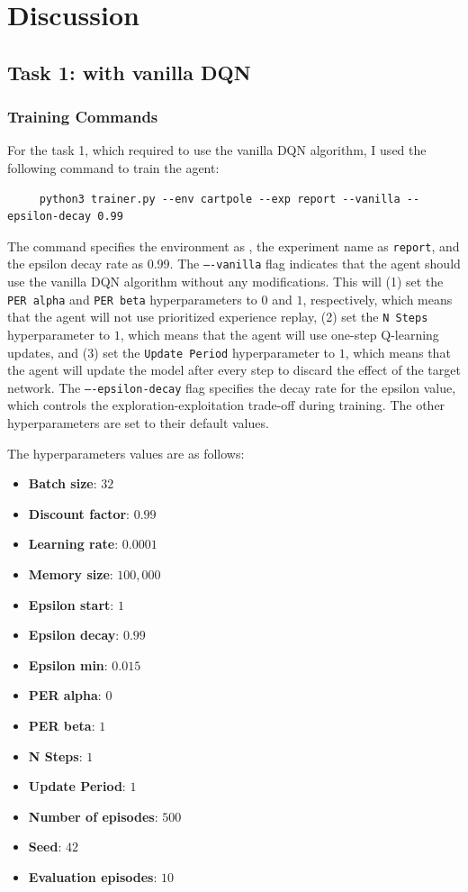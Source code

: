 \section{Discussion}

\subsection{Task 1: \cartpole with vanilla DQN}

\subsubsection{Training Commands}

For the task 1, which required to use the vanilla DQN algorithm, I used the following command to train the agent:

\begin{verbatim}
     python3 trainer.py --env cartpole --exp report --vanilla --epsilon-decay 0.99
\end{verbatim}

The command specifies the environment as \cartpole, the experiment name as \texttt{report}, and the epsilon decay rate as 0.99.
The \texttt{----vanilla} flag indicates that the agent should use the vanilla DQN algorithm without any modifications. This will (1) set the \texttt{PER alpha} and \texttt{PER beta} hyperparameters to $0$ and $1$, respectively, which means that the agent will not use prioritized experience replay, (2) set the \texttt{N Steps} hyperparameter to $1$, which means that the agent will use one-step Q-learning updates, and (3) set the \texttt{Update Period} hyperparameter to $1$, which means that the agent will update the model after every step to discard the effect of the target network.
The \texttt{----epsilon-decay} flag specifies the decay rate for the epsilon value, which controls the exploration-exploitation trade-off during training.
The other hyperparameters are set to their default values.

The hyperparameters values are as follows:
\begin{itemize}
    \item \textbf{Batch size}: $32$
    \item \textbf{Discount factor}: $0.99$
    \item \textbf{Learning rate}: $0.0001$
    \item \textbf{Memory size}: $100,000$
    \item \textbf{Epsilon start}: $1$
    \item \textbf{Epsilon decay}: $0.99$
    \item \textbf{Epsilon min}: $0.015$
    \item \textbf{PER alpha}: $0$
    \item \textbf{PER beta}: $1$
    \item \textbf{N Steps}: $1$
    \item \textbf{Update Period}: $1$
    \item \textbf{Number of episodes}: $500$
    \item \textbf{Seed}: $42$
    \item \textbf{Evaluation episodes}: $10$
\end{itemize}

